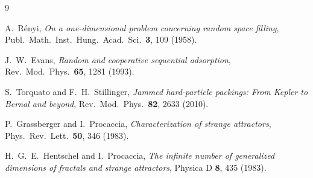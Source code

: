\documentclass[11pt]{article}
\begin{document}
\begin{thebibliography}{9}

 A.~R\'enyi,
\emph{On a one-dimensional problem concerning random space filling},
Publ.\ Math.\ Inst.\ Hung.\ Acad.\ Sci.\ \textbf{3}, 109 (1958).

 J.~W.~Evans,
\emph{Random and cooperative sequential adsorption},
Rev.\ Mod.\ Phys.\ \textbf{65}, 1281 (1993).

 S.~Torquato and F.~H.~Stillinger,
\emph{Jammed hard-particle packings: From Kepler to Bernal and beyond},
Rev.\ Mod.\ Phys.\ \textbf{82}, 2633 (2010).

 P.~Grassberger and I.~Procaccia,
\emph{Characterization of strange attractors},
Phys.\ Rev.\ Lett.\ \textbf{50}, 346 (1983).

 H.~G.~E.~Hentschel and I.~Procaccia,
\emph{The infinite number of generalized dimensions of fractals and strange
attractors}, Physica D \textbf{8}, 435 (1983).

\end{thebibliography}
\end{document}
